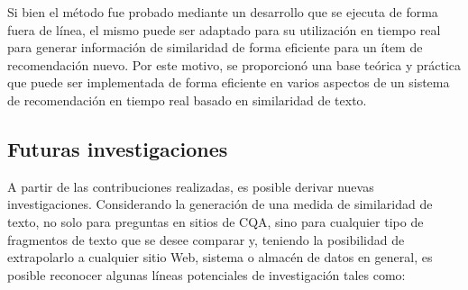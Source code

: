 \bigskip Si bien el método fue probado mediante un desarrollo que se ejecuta de forma fuera de línea, el mismo puede ser adaptado para su utilización en tiempo real para generar información de similaridad de forma eficiente para un ítem de recomendación nuevo. Por este motivo, se proporcionó una base teórica y práctica que puede ser implementada de forma eficiente en varios aspectos de un sistema de recomendación en tiempo real basado en similaridad de texto.


\subsection{Futuras investigaciones}
A partir de las contribuciones realizadas, es posible derivar nuevas investigaciones. Considerando la generación de una medida de similaridad de texto, no solo para preguntas en sitios de CQA, sino para cualquier tipo de fragmentos de texto que se desee comparar y, teniendo la posibilidad de extrapolarlo a cualquier sitio Web, sistema o almacén de datos en general, es posible reconocer algunas líneas potenciales de investigación tales como:
